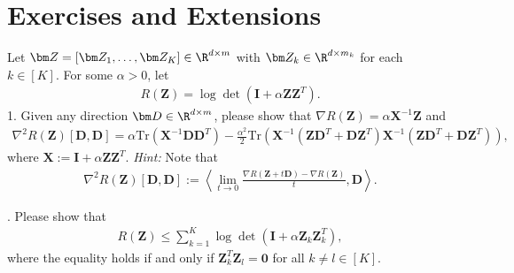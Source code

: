 \documentclass[../../book-main.tex]{subfiles}
\begin{document}
\section{Exercises and Extensions}


\begin{exercise}
    Let $\bm Z = [\bm Z_1,\dots,\bm Z_K] \in \R^{d\times m}$ with $\bm Z_k \in \R^{d\times m_k}$ for each $k \in [K]$. For some $\alpha > 0$, let 
    \begin{align*}
        R(\bm Z) = \log\det\left(\bm I + \alpha\bm Z\bm Z^T \right).
    \end{align*}
1. Given any direction $\bm D \in \R^{d\times m}$, please show that $\nabla R(\bm Z) = \alpha\bm X^{-1}\bm Z$ and 
    \begin{align*}
 \nabla^2 R(\bm Z)[\bm D, \bm D] =\alpha \mathrm{Tr}\left( \bm X^{-1}\bm D\bm D^T\right) - \frac{\alpha^2}{2}\mathrm{Tr}\left(\bm X^{-1}\left( \bm Z\bm D^T+\bm D\bm Z^T\right) \bm X^{-1}\left( \bm Z\bm D^T+\bm D\bm Z^T\right)\right),
    \end{align*}
    where $\bm X := \bm I + \alpha\bm Z\bm Z^T$. {\em Hint:} Note that
    \begin{align*}
        \nabla^2 R(\bm Z)[\bm D, \bm D] := \left\langle \lim_{t \to 0} \frac{\nabla R(\bm Z+ t\bm D) - \nabla R(\bm Z)}{t}, \bm D \right\rangle. 
    \end{align*}

. Please show that 
\begin{align*}
    R(\bm Z) \le \sum_{k=1}^K \log\det\left(\bm I + \alpha\bm Z_k\bm Z_k^T \right),
\end{align*}
where the equality holds if and only if $\bm Z_k^T\bm Z_l = \bm 0$ for all $k \neq l \in [K]$. 
\medskip 


\end{exercise}
\end{document}
